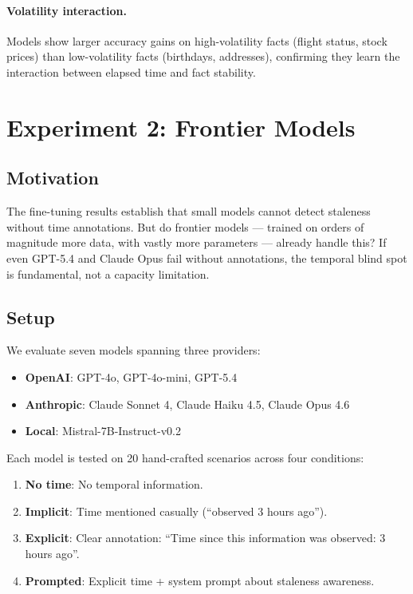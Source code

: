 \documentclass[11pt,a4paper]{article}
\begin{document}
\paragraph{Volatility interaction.}
Models show larger accuracy gains on high-volatility facts (flight status, stock prices) than low-volatility facts (birthdays, addresses), confirming they learn the interaction between elapsed time and fact stability.

\section{Experiment 2: Frontier Models}
\label{sec:frontier}

\subsection{Motivation}

The fine-tuning results establish that small models cannot detect staleness without time annotations.
But do frontier models --- trained on orders of magnitude more data, with vastly more parameters --- already handle this?
If even GPT-5.4 and Claude Opus fail without annotations, the temporal blind spot is fundamental, not a capacity limitation.

\subsection{Setup}

We evaluate seven models spanning three providers:
\begin{itemize}
    \item \textbf{OpenAI}: GPT-4o, GPT-4o-mini, GPT-5.4
    \item \textbf{Anthropic}: Claude Sonnet 4, Claude Haiku 4.5, Claude Opus 4.6
    \item \textbf{Local}: Mistral-7B-Instruct-v0.2
\end{itemize}

Each model is tested on 20 hand-crafted scenarios across four conditions:
\begin{enumerate}
    \item \textbf{No time}: No temporal information.
    \item \textbf{Implicit}: Time mentioned casually (``observed 3 hours ago'').
    \item \textbf{Explicit}: Clear annotation: ``Time since this information was observed: 3 hours ago''.
    \item \textbf{Prompted}: Explicit time + system prompt about staleness awareness.
\end{enumerate}
\end{document}
